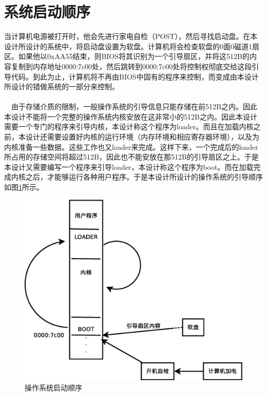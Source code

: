\documentclass[UTF8,nofonts,cs4size]{ctexrep}
\begin{document}
\section{系统启动顺序}
当计算机电源被打开时，他会先进行家电自检（POST），然后寻找启动盘。在本设计所设计的系统中，将启动盘设置为软盘。计算机将会检查软盘的0面0磁道1扇区。如果他以0xAA55结束，则BIOS将其识别为一个引导扇区，并将这512B的内容复制到内存地址0000:7c00处，然后跳转到0000:7c00处将控制权彻底交给这段引导代码。到此为止，计算机将不再由BIOS中固有的程序来控制，而变成由本设计所设计的错做系统的一部分来控制。
\paragraph{}
\indent \ \ 
由于存储介质的限制，一般操作系统的引导信息只能存储在前512B之内。因此本设计不能将一个完整的操作系统内核安放在这非常小的512B之内。因此本设计需要一个专门的程序来引导内核，本设计称这个程序为loader。而且在加载内核之前，本设计还需要设置好内核的运行环境（内存环境和相应寄存器环境），以及为内核准备一些数据。这些工作也又loader来完成。这样下来，一个完成后的loader所占用的存储空间将超过512B，因此也不能安放在那512B的引导扇区之上。于是本设计又需要编写一个程序来引导loader，本设计称这个程序为boot。而在加载完成内核之后，才能够运行各种用户程序。于是本设计所设计的操作系统的引导顺序如图\ref{start}所示。

\begin{figure}[htp]
\centering
\includegraphics[scale=0.38]{start.eps}
\caption{操作系统启动顺序}
\label{start}
\end{figure}
\end{document}
